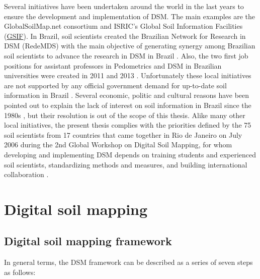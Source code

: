 Several initiatives have been undertaken around the world in the last years to 
ensure the development and implementation of DSM. The main examples are the 
GlobalSoilMap.net consortium and ISRIC's Global Soil Information Facilities
(\href{http://www.isric.org/projects/global-soil-information-facilities-gsif}{GSIF}).
In Brazil, soil scientists created the Brazilian Network for Research in DSM 
(RedeMDS) with the main objective of generating synergy among Brazilian soil 
scientists to advance the research in DSM in Brazil \cite{RedeMDS2013}. Also, 
the two first job positions for assistant professors in Pedometrics and DSM in 
Brazilian universities were created in 2011 and 2013 \cite{UFRRJ2011,UFSM2012}. 
Unfortunately these local initiatives are not supported by any official 
government demand for up-to-date soil information in Brazil 
\cite{SamuelRosa2012}. Several economic, politic and cultural reasons have been 
pointed out to explain the lack of interest on soil information in Brazil since 
the 1980s \cite{Dalmolin1999, Ker1999, KerEtAl2003, Ramos2003, Espindola2008}, 
but their resolution is out of the scope of this thesis. Alike many other local
initiatives, the present thesis complies with the priorities defined by the 75 
soil scientists from 17 countries that came together in Rio de Janeiro on July 
2006 during the 2nd Global Workshop on Digital Soil Mapping, for whom developing
and implementing DSM depends on training students and experienced soil 
scientists, standardizing methods and measures, and building international 
collaboration \cite{Boettinger2004}.

\section{Digital soil mapping}

\subsection{Digital soil mapping framework}

In general terms, the DSM framework can be described as a series of seven steps 
as follows:

